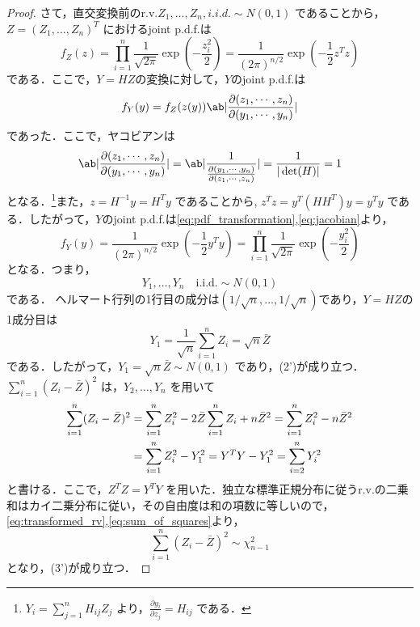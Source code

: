 \documentclass[main.tex]{subfiles}
\begin{document}
\begin{proof}
さて，直交変換前のr.v.\quad $Z_1, \dots, Z_n, i.i.d. \sim N(0,1)$ であることから，$Z=(Z_1, \dots, Z_n)^T$ におけるjoint p.d.f.は
\begin{equation}
  f_Z(z) = \prod_{i=1}^{n} \frac{1}{\sqrt{2\pi}} \exp\left(-\frac{z_i^2}{2}\right) = \frac{1}{(2\pi)^{n/2}} \exp\left(-\frac{1}{2} z^T z\right)
\end{equation}
である．ここで，$Y=HZ$の変換に対して，$Y$のjoint p.d.f.は
\begin{equation}
  f_Y(y) = f_Z(z(y)) \ab | \frac{\partial(z_1, \cdots, z_n)}{\partial(y_1, \cdots, y_n)} |
  \label{eq:pdf_transformation}
\end{equation}
であった．ここで，ヤコビアンは
\begin{equation}
  \ab |\frac{\partial(z_1, \cdots, z_n)}{\partial(y_1, \cdots, y_n)}| = \ab | \frac{1}{\frac{\partial(y_1, \cdots, y_n)}{\partial(z_1, \cdots, z_n)}} |
   = \frac{1}{|\det(H)|} = 1
   \label{eq:jacobian}
\end{equation}
となる．\footnote{$Y_i = \sum_{j=1}^{n} H_{ij} Z_j$ より，$\frac{\partial y_i}{\partial z_j} = H_{ij}$ である．}また，$z=H^{-1} y = H^T y$ であることから,
$z^T z = y^T (H H^T) y = y^T y$ である．したがって，$Y$のjoint p.d.f.は\eqref{eq:pdf_transformation},\quad \eqref{eq:jacobian}より，
\begin{equation}
  f_Y(y) = \frac{1}{(2\pi)^{n/2}} \exp\left(-\frac{1}{2} y^T y\right) = \prod_{i=1}^{n} \frac{1}{\sqrt{2\pi}} \exp\left(-\frac{y_i^2}{2}\right)
\end{equation}
となる．つまり，
\begin{equation}
  Y_1, \dots, Y_n \quad \text{i.i.d.} \sim N(0,1)
  \label{eq:transformed_rv}
\end{equation}
である．
ヘルマート行列の1行目の成分は$(1/\sqrt{n}, \dots, 1/\sqrt{n})$であり，$Y=HZ$の1成分目は
\begin{equation}
  Y_1 = \frac{1}{\sqrt{n}} \sum_{i=1}^{n} Z_i = \sqrt{n} \bar{Z}
\end{equation}
である．したがって，$Y_1 = \sqrt{n} \bar{Z} \sim N(0,1)$ であり，(2')が成り立つ．$\sum _{i=1}^{n} (Z_i - \bar{Z})^2$ は，$Y_2, \dots, Y_n$ を用いて
\begin{align}
  \sum_{i=1}^{n} (Z_i - \bar{Z})^2 &= \sum_{i=1}^{n} Z_i^2 - 2\bar{Z} \sum_{i=1}^{n} Z_i + n \bar{Z}^2 = \sum_{i=1}^{n} Z_i^2 - n \bar{Z}^2 \notag \\ 
  &= \sum_{i=1}^{n} Z_i^2 - Y_1^2 = Y^T Y - Y_1^2 = \sum_{i=2}^{n} Y_i^2
  \label{eq:sum_of_squares}
\end{align}
と書ける．ここで，$Z^T Z = Y^T Y$ を用いた．独立な標準正規分布に従うr.v.の二乗和はカイ二乗分布に従い，その自由度は和の項数に等しいので，
\eqref{eq:transformed_rv},\quad \eqref{eq:sum_of_squares}より，
\begin{equation}
  \sum_{i=1}^{n} (Z_i - \bar{Z})^2  \sim \chi^2_{n-1}
\end{equation}
となり，(3')が成り立つ．


\end{proof}
\end{document}
